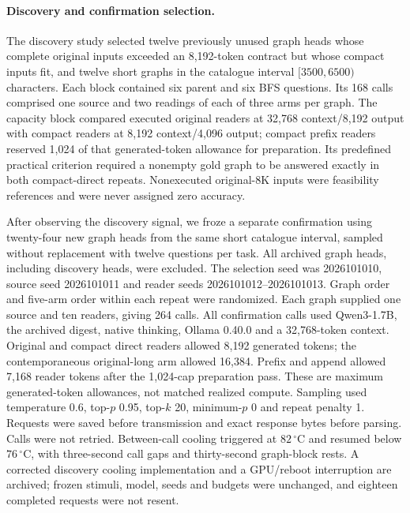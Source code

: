 \paragraph{Discovery and confirmation selection.} The discovery study selected twelve previously unused graph heads whose complete original inputs exceeded an 8,192-token contract but whose compact inputs fit, and twelve short graphs in the catalogue interval $[3500,6500)$ characters. Each block contained six parent and six BFS questions. Its 168 calls comprised one source and two readings of each of three arms per graph. The capacity block compared executed original readers at 32,768 context/8,192 output with compact readers at 8,192 context/4,096 output; compact prefix readers reserved 1,024 of that generated-token allowance for preparation. Its predefined practical criterion required a nonempty gold graph to be answered exactly in both compact-direct repeats. Nonexecuted original-8K inputs were feasibility references and were never assigned zero accuracy.

After observing the discovery signal, we froze a separate confirmation using twenty-four new graph heads from the same short catalogue interval, sampled without replacement with twelve questions per task. All archived graph heads, including discovery heads, were excluded. The selection seed was 2026101010, source seed 2026101011 and reader seeds 2026101012--2026101013. Graph order and five-arm order within each repeat were randomized. Each graph supplied one source and ten readers, giving 264 calls. All confirmation calls used Qwen3-1.7B, the archived digest, native thinking, Ollama 0.40.0 and a 32,768-token context. Original and compact direct readers allowed 8,192 generated tokens; the contemporaneous original-long arm allowed 16,384. Prefix and append allowed 7,168 reader tokens after the 1,024-cap preparation pass. These are maximum generated-token allowances, not matched realized compute. Sampling used temperature 0.6, top-$p$ 0.95, top-$k$ 20, minimum-$p$ 0 and repeat penalty 1. Requests were saved before transmission and exact response bytes before parsing. Calls were not retried. Between-call cooling triggered at $82\,^{\circ}\mathrm{C}$ and resumed below $76\,^{\circ}\mathrm{C}$, with three-second call gaps and thirty-second graph-block rests. A corrected discovery cooling implementation and a GPU/reboot interruption are archived; frozen stimuli, model, seeds and budgets were unchanged, and eighteen completed requests were not resent.

